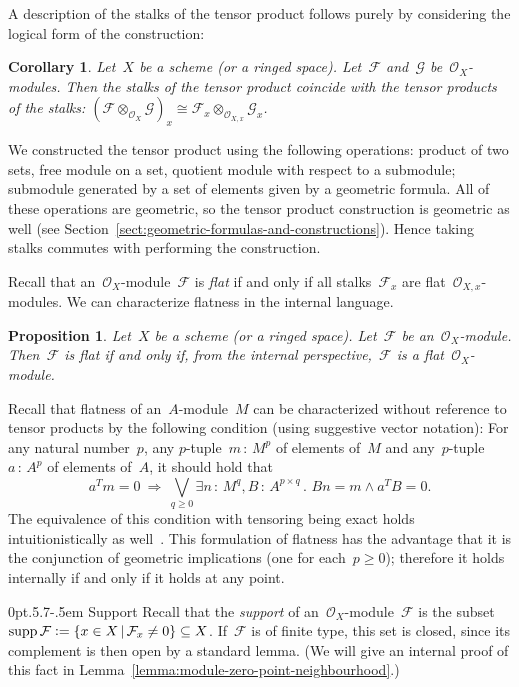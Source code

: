 \documentclass[10pt,reqno,a4paper]{amsbook}
\makeatletter
\theoremstyle{definition}
\theoremstyle{plain}
\newtheorem{prop}[defn]{Proposition}
\newtheorem{cor}[defn]{Corollary}
\theoremstyle{remark}
\newcommand{\F}{\mathcal{F}}
\renewcommand{\G}{\mathcal{G}}
\renewcommand{\O}{\mathcal{O}}
\DeclareMathOperator{\supp}{supp}
\newcommand{\?}{\,{:}\,}
\renewcommand{\_}{\mathpunct{.}\,}
\newcommand{\defeq}{\vcentcolon=}
\renewenvironment{proof}[1][\proofname]{\par
  \pushQED{\qed}%
  \normalfont \topsep6\p@\@plus6\p@\relax
  \trivlist
  \item[\hskip\labelsep
        \itshape
    #1\@addpunct{.}]\ignorespaces
}{%
  \popQED\endtrivlist\@endpefalse
}
\def\subsection{\@startsection{subsection}{2}%
  {0pt}{.5\linespacing\@plus.7\linespacing}{-.5em}%
  {\normalfont\bfseries}}
\makeatother
\begin{document}
A description of the stalks of the tensor product
follows purely by considering the logical form of the construction:
\begin{cor}Let~$X$ be a scheme (or a ringed space). Let~$\F$ and~$\G$
be~$\O_X$-modules. Then the stalks of the tensor product coincide with the
tensor products of the stalks: $(\F \otimes_{\O_X} \G)_x \cong \F_x
\otimes_{\O_{X,x}} \G_x$.\end{cor}
\begin{proof}
We constructed the tensor product using the following operations: product of
two sets, free module on a set, quotient module with respect to a submodule;
submodule generated by a set of elements given by a geometric formula.
All of these operations are geometric, so the tensor product construction is
geometric as well (see Section~\ref{sect:geometric-formulas-and-constructions}). Hence taking stalks commutes with performing the
construction.
\end{proof}

Recall that an~$\O_X$-module~$\F$ is \emph{flat} if and only if all
stalks~$\F_x$ are flat~$\O_{X,x}$-modules. We can characterize flatness in the
internal language.
\begin{prop}\label{prop:flatness}
Let~$X$ be a scheme (or a ringed space). Let~$\F$ be
an~$\O_X$-module. Then~$\F$ is flat if and only if, from the internal
perspective,~$\F$ is a flat~$\O_X$-module.
\end{prop}
\begin{proof}
Recall that flatness of an~$A$-module~$M$ can be characterized without
reference to tensor products by the following condition (using
suggestive vector notation): For any natural number~$p$,
any $p$-tuple~$m \? M^p$ of elements of~$M$ and
any~$p$-tuple $a \? A^p$ of elements of~$A$, it should hold that
\[
  a^T m = 0 \ \Longrightarrow\
  \bigvee\limits_{q \geq 0} \exists n\?M^q, B\?A^{p \times q}\_
  Bn = m \wedge a^T B = 0. \]
The equivalence of this condition with tensoring being exact holds
intuitionistically as
well~\cite[Theorem~III.5.3]{mines-richman-ruitenburg:constructive-algebra}.
This formulation of flatness has the advantage that it is the conjunction of
geometric implications (one for each~$p \geq 0$); therefore it holds internally
if and only if it holds at any point.
\end{proof}


\subsection{Support} Recall that the \emph{support} of an~$\O_X$-module~$\F$ is
the subset~$\supp\F \defeq \{ x \in X \,|\, \F_x \neq 0 \} \subseteq X$. If~$\F$ is
of finite type, this set is closed, since its complement is then open by a
standard lemma. (We will give an internal proof of this fact in
Lemma~\ref{lemma:module-zero-point-neighbourhood}.)
\end{document}
